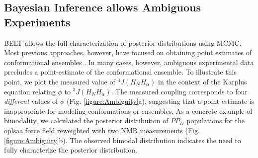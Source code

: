 \documentclass[11pt,titlepage]{article}
\begin{document}
\subsection*{Bayesian Inference allows Ambiguous Experiments}

BELT allows the full characterization of posterior distributions using MCMC.  Most previous approaches, however, have focused on obtaining point estimates of conformational ensembles  \citep{rozycki2011saxs,  Graf2007}.  In many cases, however, ambiguous experimental data precludes a point-estimate of the conformational ensemble.  To illustrate this point, we plot the measured  \citep{Graf2007} value of $^3J(H_NH_\alpha)$ in the context of the Karplus \citep{vogeli2007limits} equation relating $\phi$ to $^3J(H_NH_\alpha)$.  The measured coupling corresponds to four \emph{different} values of $\phi$ (Fig. \ref{figure:Ambiguity}a), suggesting that a point estimate is inappropriate for modeling conformations or ensembles.  As a concrete example of bimodality, we calculated the posterior distribution of $PP_{II}$ populations for the oplsaa force field reweighted with two NMR measurements (Fig. \ref{figure:Ambiguity}b).  The observed bimodal distribution indicates the need to fully characterize the posterior 
distribution.  
\end{document}
